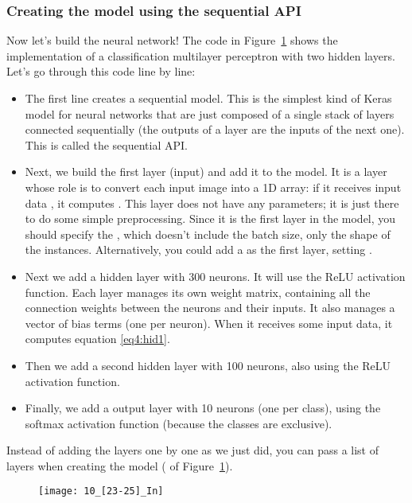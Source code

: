 \subsubsection{Creating the model using the sequential API}
Now let's build the neural network! The code in Figure~\ref{10_[23-25]_In} shows the implementation of a classification multilayer perceptron with two hidden layers. Let's go through this code line by line:
\begin{itemize}
\item The first line creates a sequential model. This is the simplest kind of Keras model for neural networks that are just composed of a single stack of layers connected sequentially (the outputs of a layer are the inputs of the next one). This is called the sequential API.
\item Next, we build the first layer (input) and add it to the model. It is a  layer whose role is to convert each input image into a 1D array: if it receives input data , it computes . This layer does not have any parameters; it is just there to do some simple preprocessing. Since it is the first layer in the model, you should specify the , which doesn't include the batch size, only the shape of the instances. Alternatively, you could add a  as the first layer, setting .
\item Next we add a  hidden layer with \num{300} neurons. It will use the ReLU activation function. Each  layer manages its own weight matrix, containing all the connection weights between the neurons and their inputs. It also manages a vector of bias terms (one per neuron). When it receives some input data, it computes equation \eqref{eq4:hid1}.
\item Then we add a second  hidden layer with \num{100} neurons, also using the ReLU activation function.
\item Finally, we add a  output layer with \num{10} neurons (one per class), using the softmax activation function (because the classes are exclusive).
\end{itemize}
Instead of adding the layers one by one as we just did, you can pass a list of layers when creating the  model ( of Figure~\ref{10_[23-25]_In}).
\begin{figure}[h!t]
\centering
\texttt{[image: 10\_[23-25]\_In]}
\caption{}\label{10_[23-25]_In}
\end{figure}


